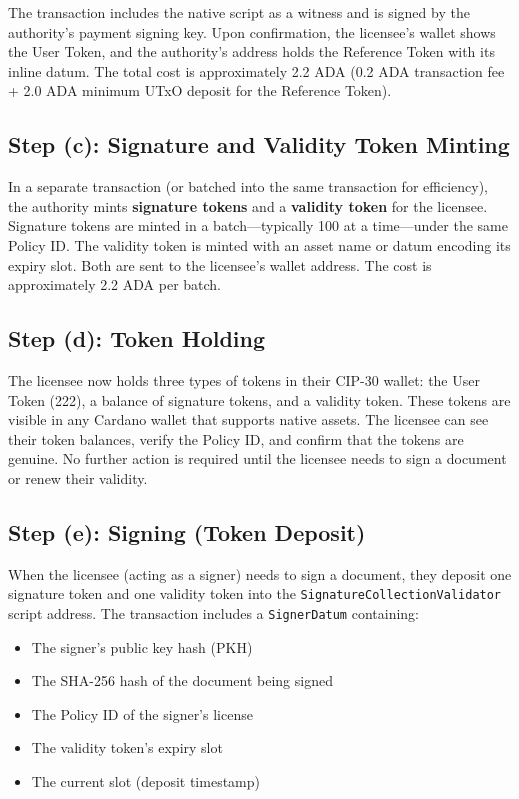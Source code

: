 The transaction includes the native script as a witness and is signed by the authority's payment signing key. Upon confirmation, the licensee's wallet shows the User Token, and the authority's address holds the Reference Token with its inline datum. The total cost is approximately 2.2 ADA (0.2 ADA transaction fee + 2.0 ADA minimum UTxO deposit for the Reference Token).

\subsection{Step (c): Signature and Validity Token Minting}

In a separate transaction (or batched into the same transaction for efficiency), the authority mints \textbf{signature tokens} and a \textbf{validity token} for the licensee. Signature tokens are minted in a batch---typically 100 at a time---under the same Policy ID. The validity token is minted with an asset name or datum encoding its expiry slot. Both are sent to the licensee's wallet address. The cost is approximately 2.2 ADA per batch.

\subsection{Step (d): Token Holding}

The licensee now holds three types of tokens in their CIP-30 wallet: the User Token (222), a balance of signature tokens, and a validity token. These tokens are visible in any Cardano wallet that supports native assets. The licensee can see their token balances, verify the Policy ID, and confirm that the tokens are genuine. No further action is required until the licensee needs to sign a document or renew their validity.

\subsection{Step (e): Signing (Token Deposit)}

When the licensee (acting as a signer) needs to sign a document, they deposit one signature token and one validity token into the \texttt{SignatureCollectionValidator} script address. The transaction includes a \texttt{SignerDatum} containing:

\begin{itemize}[nosep]
  \item The signer's public key hash (PKH)
  \item The SHA-256 hash of the document being signed
  \item The Policy ID of the signer's license
  \item The validity token's expiry slot
  \item The current slot (deposit timestamp)
\end{itemize}

